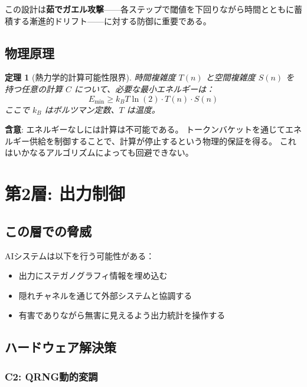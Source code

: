 \documentclass[11pt,a4paper]{article}
\newtheorem{theorem}{定理}
\begin{document}
この設計は\textbf{茹でガエル攻撃}——各ステップで閾値を下回りながら時間とともに蓄積する漸進的ドリフト——に対する防御に重要である。

\subsection{物理原理}

\begin{theorem}[熱力学的計算可能性限界]
時間複雑度 $T(n)$ と空間複雑度 $S(n)$ を持つ任意の計算 $C$ について、必要な最小エネルギーは：
\begin{equation}
E_{\min} \geq k_B T \ln(2) \cdot T(n) \cdot S(n)
\end{equation}
ここで $k_B$ はボルツマン定数、$T$ は温度。
\end{theorem}

\textbf{含意}: エネルギーなしには計算は不可能である。
トークンバケットを通じてエネルギー供給を制御することで、計算が停止するという物理的保証を得る。
これはいかなるアルゴリズムによっても回避できない。

\section{第2層: 出力制御}
\label{sec:layer2}

\subsection{この層での脅威}

AIシステムは以下を行う可能性がある：
\begin{itemize}
    \item 出力にステガノグラフィ情報を埋め込む
    \item 隠れチャネルを通じて外部システムと協調する
    \item 有害でありながら無害に見えるよう出力統計を操作する
\end{itemize}

\subsection{ハードウェア解決策}

\subsubsection{C2: QRNG動的変調}
\end{document}
